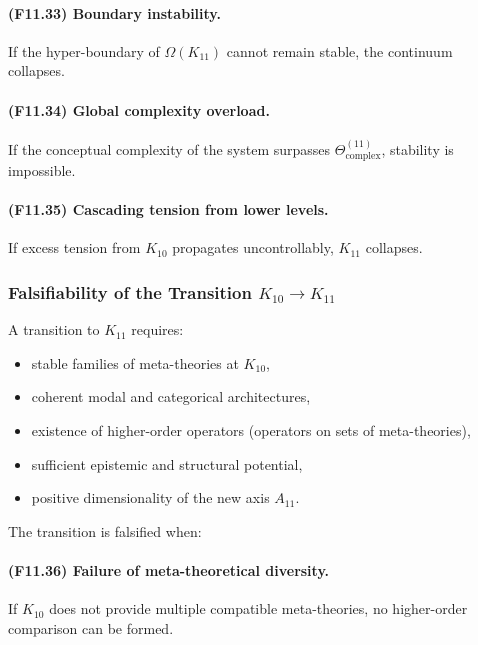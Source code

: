 \paragraph{(F11.33) Boundary instability.}
If the hyper-boundary of $\Omega(K_{11})$ cannot remain stable,
the continuum collapses.

\paragraph{(F11.34) Global complexity overload.}
If the conceptual complexity of the system surpasses
$\Theta_{\mathrm{complex}}^{(11)}$, stability is impossible.

\paragraph{(F11.35) Cascading tension from lower levels.}
If excess tension from $K_{10}$ propagates uncontrollably,
$K_{11}$ collapses.



\subsubsection{Falsifiability of the Transition $K_{10} \to K_{11}$}

A transition to $K_{11}$ requires:

\begin{itemize}
    \item stable families of meta-theories at $K_{10}$,
    \item coherent modal and categorical architectures,
    \item existence of higher-order operators (operators on sets of meta-theories),
    \item sufficient epistemic and structural potential,
    \item positive dimensionality of the new axis $A_{11}$.
\end{itemize}

The transition is falsified when:

\paragraph{(F11.36) Failure of meta-theoretical diversity.}
If $K_{10}$ does not provide multiple compatible meta-theories,
no higher-order comparison can be formed.

